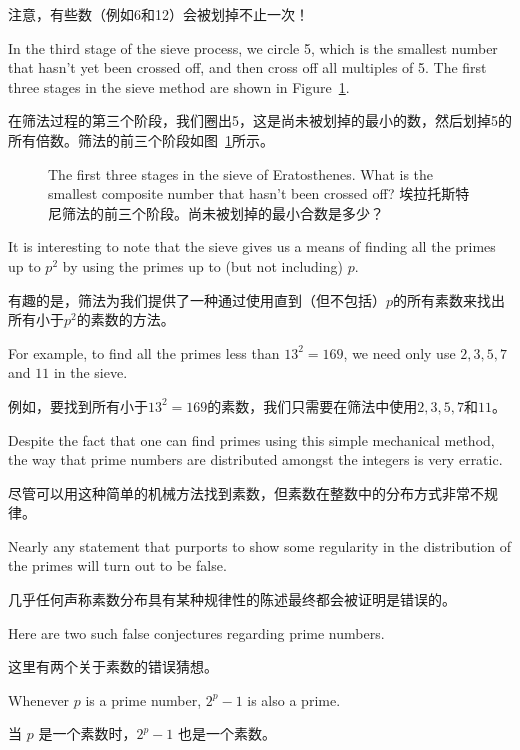 注意，有些数（例如6和12）会被划掉不止一次！

In the third stage of the sieve process, we circle
5, which is the smallest number that hasn't yet been crossed off, and
then cross off all multiples of 5.  The first three stages in the
sieve method are shown in Figure~\ref{fig:sieve}.

在筛法过程的第三个阶段，我们圈出5，这是尚未被划掉的最小的数，然后划掉5的所有倍数。筛法的前三个阶段如图~\ref{fig:sieve}所示。

\begin{figure}[!hbtp]

\caption[The sieve of Eratosthenes.]{The first three stages in the %
sieve of Eratosthenes. What is the smallest composite number that %
hasn't been crossed off? 埃拉托斯特尼筛法的前三个阶段。尚未被划掉的最小合数是多少？}
\label{fig:sieve} 
\end{figure}

It is interesting to note that the sieve gives us a means of finding
all the primes up to $p^2$ by using the primes up to (but not
including) $p$.

有趣的是，筛法为我们提供了一种通过使用直到（但不包括）$p$的所有素数来找出所有小于$p^2$的素数的方法。

For
example, to find all the primes less than $13^2 = 169$, we need only
use $2, 3, 5, 7$ and $11$ in the sieve.

例如，要找到所有小于$13^2 = 169$的素数，我们只需要在筛法中使用$2, 3, 5, 7$和$11$。

Despite the fact that one can find primes using this simple 
mechanical method, the way that prime numbers are distributed
amongst the integers is very erratic.

尽管可以用这种简单的机械方法找到素数，但素数在整数中的分布方式非常不规律。

Nearly any statement that
purports to show some regularity in the distribution of the 
primes will turn out to be false.

几乎任何声称素数分布具有某种规律性的陈述最终都会被证明是错误的。

Here are two such false
conjectures regarding prime numbers.

这里有两个关于素数的错误猜想。

\begin{conj} \label{conj:ferm}
Whenever $p$ is a prime number, $2^p-1$ is also a prime.


当 $p$ 是一个素数时，$2^p-1$ 也是一个素数。
\end{conj}

